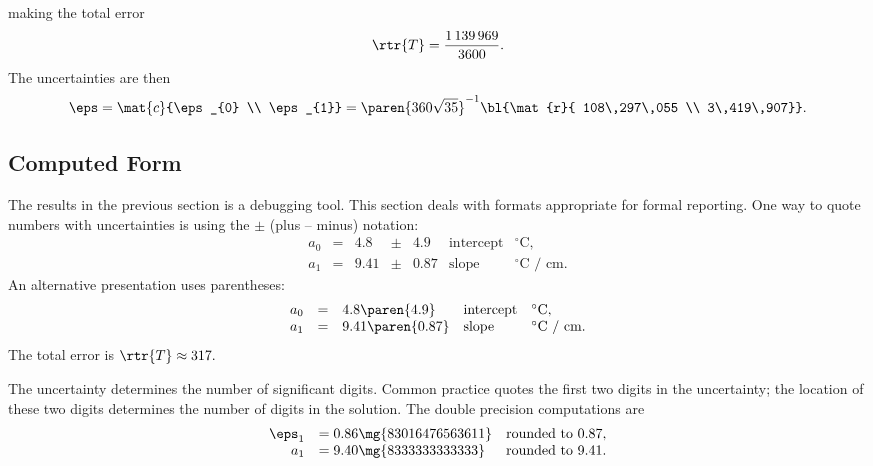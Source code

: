 making the total error
  \begin{equation*}
      \rtr{T} = \frac{1\,139\,969}{3600}.
  \end{equation*}
The uncertainties are then
  \begin{equation*}   %
    \eps = \mat{c}{\eps_{0} \\ \eps_{1}} = \paren{360 \sqrt{35}}^{-1} \bl{\mat{r}{ 108\,297\,055 \\ 3\,419\,907}}.
  \end{equation*}

\subsection{Computed Form}  %
The results in the previous section is a debugging tool. This section deals with formats appropriate for formal reporting.
One way to quote numbers with uncertainties is using the $\pm$ (plus -- minus) notation:
  \begin{equation*}
    \begin{array}{rclclll}
      a_{0} & = & 4.8  & \pm & 4.9  & \text{intercept} & ^{\circ} \text{C} , \\
      a_{1} & = & 9.41 & \pm & 0.87 & \text{slope}     & ^{\circ} \text{C / cm} .
    \end{array}
    \label{eq:soln vector}
  \end{equation*}
An alternative presentation uses parentheses:
  \begin{equation*}
    \begin{array}{rclll}
      a_{0} & = & 4.8 \paren{4.9}   & \text{intercept} & ^{\circ} \text{C} , \\
      a_{1} & = & 9.41 \paren{0.87} & \text{slope}     & ^{\circ} \text{C / cm}.
    \end{array}
  \end{equation*}
The total error is $\rtr{T} \approx 317.$

The uncertainty determines the number of significant digits. Common practice quotes the first two digits in the uncertainty; the location of these two digits determines the number of digits in the solution. The double precision computations are
  \begin{equation*}   %
    \begin{array}{rll}
      \eps_{1} &= 0.86\mg{83016476563611} & \text{rounded to 0.87}, \\
       a_{1}   &= 9.40\mg{8333333333333}  & \text{rounded to 9.41}.
   \end{array}
  \end{equation*}


